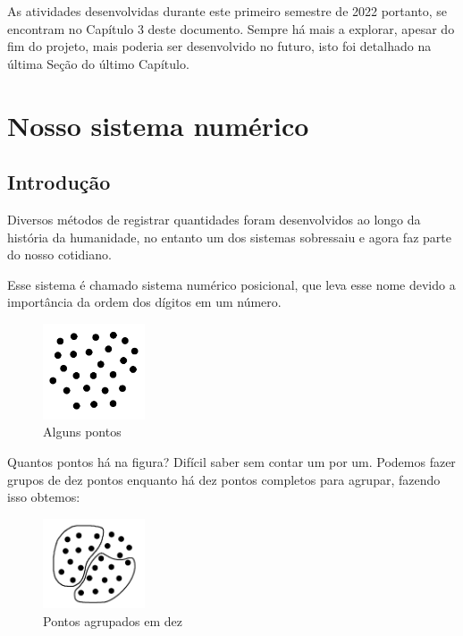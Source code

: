 \documentclass{report}
\theoremstyle{definition}
\begin{document}
As atividades desenvolvidas durante este primeiro semestre de 2022 portanto, se encontram no Capítulo 3 deste documento. Sempre há mais a explorar, apesar do fim do projeto, mais poderia ser desenvolvido no futuro, isto foi detalhado na última Seção do último Capítulo. 

\chapter{Nosso sistema numérico}
\label{chapter:secaoBases}

\section{Introdução}

Diversos métodos de registrar quantidades foram desenvolvidos ao longo da história da humanidade, no entanto um dos sistemas sobressaiu e agora faz parte do nosso cotidiano.

Esse sistema é chamado sistema numérico posicional, que leva esse nome devido a importância da ordem dos dígitos em um número. 

\begin{figure}[H]
    \centering
    \includegraphics[width=0.27\textwidth]{imgs/pontos.png}
    \caption{Alguns pontos}
\end{figure}

Quantos pontos há na figura? Difícil saber sem contar um por um. Podemos fazer grupos de dez pontos enquanto há dez pontos completos para agrupar, fazendo isso obtemos:

\begin{figure}[H]
    \centering
    \includegraphics[width=0.27\textwidth]{imgs/pontosAgrupados.png}
    \caption{Pontos agrupados em dez}
\end{figure}
\end{document}
